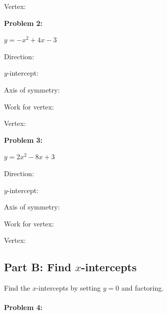 \documentclass[12pt]{article}
\begin{document}
			Vertex: \underline{\hspace{2in}}

			\newpage

			\textbf{Problem 2:}
            
            $y = -x^2 + 4x - 3$

			\vspace{1cm}

			Direction: \underline{\hspace{2in}}

			$y$-intercept: \underline{\hspace{2in}}

			Axis of symmetry: \underline{\hspace{2in}}

			Work for vertex:

			\vspace{3cm}

			Vertex: \underline{\hspace{2in}}

			\vspace{2cm}

			\textbf{Problem 3:}
            
            $y = 2x^2 - 8x + 3$

			\vspace{1cm}

			Direction: \underline{\hspace{2in}}

			$y$-intercept: \underline{\hspace{2in}}

			Axis of symmetry: \underline{\hspace{2in}}

			Work for vertex:

			\vspace{3cm}

			Vertex: \underline{\hspace{2in}}

			\newpage

		\subsection*{Part B: Find $x$-intercepts}

			Find the $x$-intercepts by setting $y = 0$ and factoring.\\\\

			\textbf{Problem 4:}
            
\end{document}
